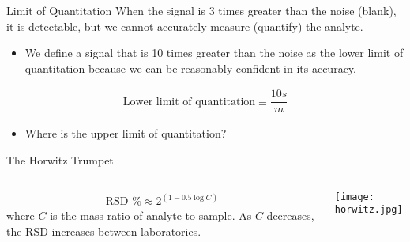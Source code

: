 \documentclass[notes=only]{beamer}
\begin{document}
\begin{frame}{Limit of Quantitation}
		When the signal is 3 times greater than the noise (blank),
			it is detectable, but we cannot accurately measure
			(quantify) the analyte.
	\begin{itemize}
		\item We define a signal that is 10 times greater than the noise
			as the \alert{lower limit of quantitation} because we
			can be \alert{reasonably} confident in its accuracy.
	\end{itemize}

	\begin{align*}
		\text{Lower limit of quantitation} \equiv \dfrac{10s}{m}
	\end{align*}

	\begin{itemize}
		\item Where is the upper limit of quantitation?
	\end{itemize}
\end{frame}


\begin{frame}{The Horwitz Trumpet}
	\begin{columns}
		\begin{align*}
			\text{RSD \%} \approx 2^{(1-0.5 \log C)}
		\end{align*}
		where $C$ is the mass ratio of analyte to sample. As $C$
		decreases, the RSD increases between laboratories.
		\begin{center}
			\texttt{[image: horwitz.jpg]}
		\end{center}
	\end{columns}
\end{frame}
\end{document}
